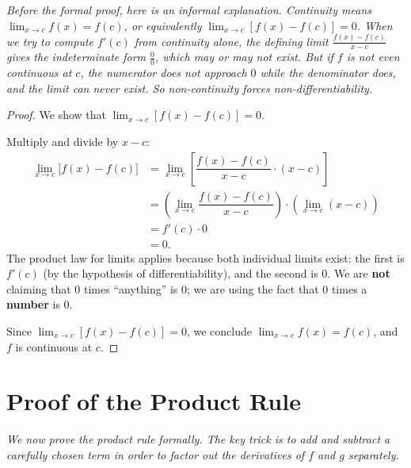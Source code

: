 \textit{Before the formal proof, here is an informal explanation.  Continuity means $\lim_{x \to c} f(x) = f(c)$, or equivalently $\lim_{x \to c}[f(x) - f(c)] = 0$.  When we try to compute $f'(c)$ from continuity alone, the defining limit $\frac{f(x)-f(c)}{x-c}$ gives the indeterminate form $\frac{0}{0}$, which may or may not exist.  But if $f$ is not even continuous at $c$, the numerator does not approach $0$ while the denominator does, and the limit can never exist.  So non-continuity forces non-differentiability.}

\begin{proof}
We show that $\lim_{x \to c}[f(x) - f(c)] = 0$.

Multiply and divide by $x - c$:
\begin{align*}
  \lim_{x \to c}\bigl[f(x) - f(c)\bigr]
  &= \lim_{x \to c}\left[\dfrac{f(x) - f(c)}{x - c} \cdot (x - c)\right] \\
  &= \left(\lim_{x \to c} \dfrac{f(x) - f(c)}{x - c}\right) \cdot \left(\lim_{x \to c}(x - c)\right) \\
  &= f'(c) \cdot 0 \\
  &= 0.
\end{align*}
The product law for limits applies because both individual limits exist: the first is $f'(c)$ (by the hypothesis of differentiability), and the second is $0$.  We are \textbf{not} claiming that $0$ times ``anything'' is $0$; we are using the fact that $0$ times a \textbf{number} is $0$.

Since $\lim_{x \to c}[f(x) - f(c)] = 0$, we conclude $\lim_{x \to c} f(x) = f(c)$, and $f$ is continuous at $c$.
\end{proof}

\section{Proof of the Product Rule}
\label{sec:3.6}

\textit{We now prove the product rule formally.  The key trick is to add and subtract a carefully chosen term in order to factor out the derivatives of $f$ and $g$ separately.}

